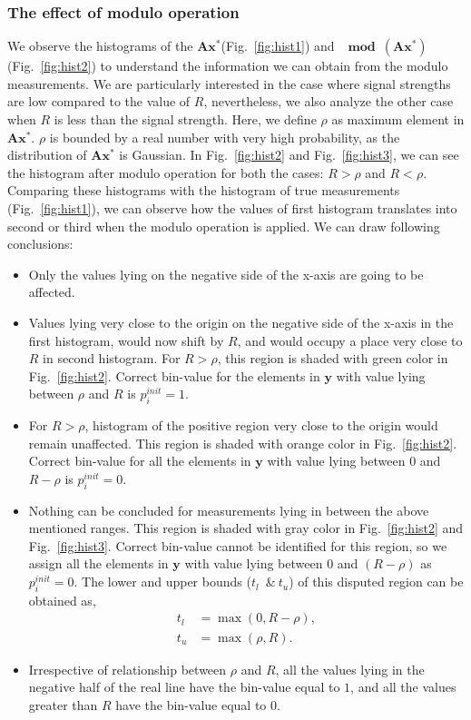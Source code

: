 \subsubsection{The effect of modulo operation} 
\label{sec:modeff}
We observe the histograms of the $\mathbf{Ax^*}$(Fig.~\ref{fig:hist1}) and $\mathbf{\mod(\mathbf{Ax^*})}$(Fig.~\ref{fig:hist2}) to understand the information we can obtain from the modulo measurements. We are particularly interested in the case where signal strengths are low compared to the value of $R$, nevertheless, we also analyze the other case when $R$ is less than the signal strength. Here, we define $\rho$ as maximum element in $\mathbf{Ax^*}$. $\rho$ is bounded by a real number with very high probability, as the distribution of $\mathbf{Ax^*}$ is Gaussian.
In Fig.~\ref{fig:hist2} and Fig.~\ref{fig:hist3}, we can see the histogram after modulo operation for both the cases: $R>\rho$ and $R<\rho$. Comparing these histograms with the histogram of true measurements (Fig.~\ref{fig:hist1}), we can observe how the values of first histogram translates into second or third when the modulo operation is applied. We can draw following conclusions:
\begin{itemize}
	\item Only the values lying on the negative side of the x-axis are going to be affected.
	\item Values lying very close to the origin on the negative side of the x-axis in the first histogram, would now shift by $R$, and would occupy a place very close to $R$ in second histogram. For $R>\rho$, this region is shaded with green color in Fig.~\ref{fig:hist2}. Correct bin-value for the elements in $\mathbf{y}$ with value lying between $\rho$ and $R$ is $p^{init}_{i} = 1$.
	\item For $R>\rho$, histogram of the positive region very close to the origin would remain unaffected. This region is shaded with orange color in Fig.~\ref{fig:hist2}. Correct bin-value for all the elements in $\mathbf{y}$ with value lying between $0$ and $R-\rho$ is $p^{init}_{i} = 0$.
	\item Nothing can be concluded for measurements lying in between the above mentioned ranges. This region is shaded with gray color in Fig.~\ref{fig:hist2} and Fig.~\ref{fig:hist3}. Correct bin-value cannot be identified for this region, so we assign all the elements in $\mathbf{y}$ with value lying between $0$ and $(R-\rho)$ as $p^{init}_{i} = 0$. The lower and upper bounds ($t_l$~\&$~t_u$) of this disputed region can be obtained as, 
	\begin{align*}
	t_l & = \max(0, R-\rho), \\
	t_u & = \max(\rho, R).
	\end{align*}
	\item Irrespective of relationship between $\rho$ and $R$, all the values lying in the negative half of the real line have the bin-value equal to $1$, and all the values greater than $R$ have the bin-value equal to $0$.
\end{itemize}

